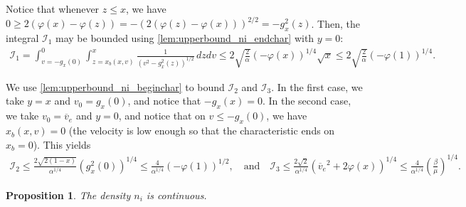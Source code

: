 \documentclass{article}
\newtheorem{proposition}{Proposition}[section]
\numberwithin{equation}{section}
\newcommand{\ve}{{\overline{v}_e}} %
\newcommand{\DomUpL}{{\mathcal{D}_1}} %
\newcommand{\DomUpR}{{\mathcal{D}_2}} %
\newcommand{\DomLow}{{\mathcal{D}_3}} %
\newcommand{\IntUpL}{{\mathcal{I}_1}} %
\newcommand{\IntUpR}{{\mathcal{I}_2}} %
\newcommand{\IntLow}{{\mathcal{I}_3}} %
\begin{document}
{	
	Notice that whenever $z \leqslant x$, we have $0 \geqslant 2\left(\varphi(x) - \varphi(z)\right) = - \left(2\left(\varphi(z) - \varphi(x)\right)\right)^{2/2} = - g_x^2(z)$. Then, the integral $\IntUpL$ may be bounded using \cref{lem:upperbound_ni_endchar} with $y=0$:
	\begin{align*}
		\IntUpL = \int_{v=-g_x(0)}^{0} \int_{z=x_b(x,v)}^{x} \frac{1}{\left(v^2 - g_x^2(z)\right)^{1/2}} \, dz dv 
		\leqslant 2 \sqrt{\frac{2}{\alpha}} \left(-\varphi(x)\right)^{1/4} \sqrt{x}
		\leqslant 2 \sqrt{\frac{2}{\alpha}} \left(-\varphi(1)\right)^{1/4}.
	\end{align*}
	
	We use \cref{lem:upperbound_ni_beginchar} to bound $\IntUpR$ and $\IntLow$. In the first case, we take $y=x$ and $v_0 = g_x(0)$, and notice that $-g_x(x)=0$. In the second case, we take $v_0 = \ve$ and $y=0$, and notice that on $v \leqslant -g_x(0)$, we have $x_b(x,v) = 0$ (the velocity is low enough so that the characteristic ends on $x_b=0$). This yields
	\begin{align*}
		\IntUpR \leqslant \frac{2\sqrt{2(1-x)}}{\alpha^{1/4}} \left(g_x^2(0)\right)^{1/4} \leqslant \frac{4}{\alpha^{1/4}} \left(-\varphi(1)\right)^{1/2} , \quad\text{and}\quad
		\IntLow \leqslant \frac{2\sqrt{2}}{\alpha^{1/4}} \left(\ve^2 + 2 \varphi(x)\right)^{1/4} \leqslant \frac{4}{\alpha^{1/4}} \left(\frac{\beta}{\mu}\right)^{1/4}.
	\end{align*}
}

\begin{proposition}
	The density $n_i$ is continuous. 
\end{proposition}
\end{document}
